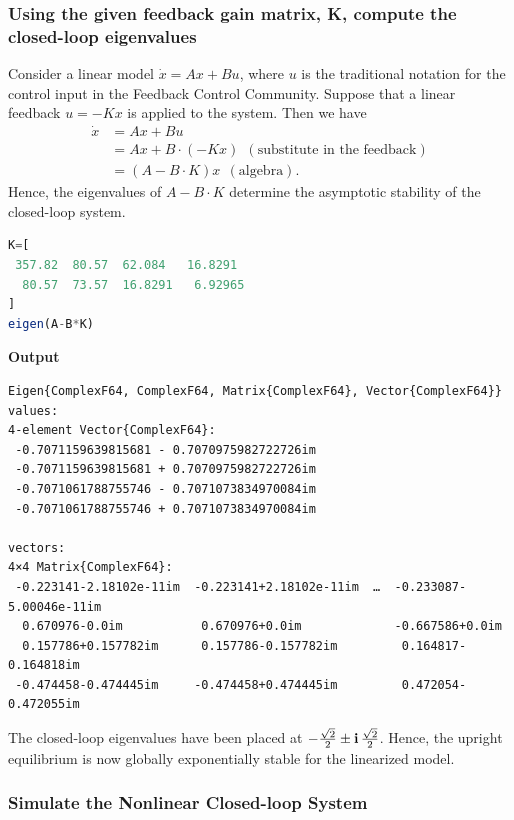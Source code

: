 \subsubsection{Using the given feedback gain matrix, K, compute the closed-loop eigenvalues}
Consider a linear model $\dot{x} = Ax + B u$, where $u$ is the traditional notation for the control input in the Feedback Control Community. Suppose that a linear feedback $u = -Kx$ is applied to the system. Then we have
\begin{align*}
    \dot{x} &= Ax + Bu \\
    &= Ax + B\cdot \left( -Kx \right) ~~(\text{substitute in the feedback}) \\
    & = \left( A-B\cdot K\right) x ~~(\text{algebra}).
\end{align*}
Hence, the eigenvalues of $A-B\cdot K$ determine the asymptotic stability of the closed-loop system.
 \bigskip

\begin{lstlisting}[language=Julia,style=mystyle]
K=[
 357.82  80.57  62.084   16.8291
  80.57  73.57  16.8291   6.92965
]
eigen(A-B*K)
\end{lstlisting}
\textbf{Output} 
\begin{verbatim}
Eigen{ComplexF64, ComplexF64, Matrix{ComplexF64}, Vector{ComplexF64}}
values:
4-element Vector{ComplexF64}:
 -0.7071159639815681 - 0.7070975982722726im
 -0.7071159639815681 + 0.7070975982722726im
 -0.7071061788755746 - 0.7071073834970084im
 -0.7071061788755746 + 0.7071073834970084im
 
vectors:
4×4 Matrix{ComplexF64}:
 -0.223141-2.18102e-11im  -0.223141+2.18102e-11im  …  -0.233087-5.00046e-11im
  0.670976-0.0im           0.670976+0.0im             -0.667586+0.0im
  0.157786+0.157782im      0.157786-0.157782im         0.164817-0.164818im
 -0.474458-0.474445im     -0.474458+0.474445im         0.472054-0.472055im
\end{verbatim}
The closed-loop eigenvalues have been placed at $-\frac{\sqrt{2}}{2} \pm \mathop{\bm{\mathrm i}} \frac{\sqrt{2}}{2}$. Hence, the upright equilibrium is now globally exponentially stable for the linearized model.

\subsubsection{Simulate the Nonlinear Closed-loop System}

